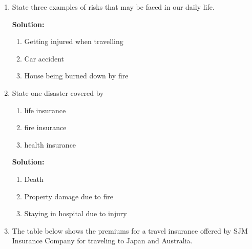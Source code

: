 \documentclass{report}
\newcommand{\sol}{

    \vspace{0.5em}\textbf{Solution:}\vspace{0.5em}}
\begin{document}
\onehalfspacing
\begin{enumerate}
    \item State three examples of risks that may be faced in our daily life. \sol{}
          \begin{enumerate}
              \item Getting injured when travelling
              \item Car accident
              \item House being burned down by fire
          \end{enumerate}
          \vspace{0.5cm}

    \item State one disaster covered by
          \begin{enumerate}
              \item life insurance
              \item fire insurance
              \item health insurance
          \end{enumerate}
          \sol{}
          \begin{enumerate}
              \item Death
              \item Property damage due to fire
              \item Staying in hospital due to injury
          \end{enumerate}
          \vspace{0.5cm}

    \item The table below shows the premiums for a travel insurance offered by SJM
          Insurance Company for traveling to Japan and Australia.


\end{enumerate}
\end{document}
